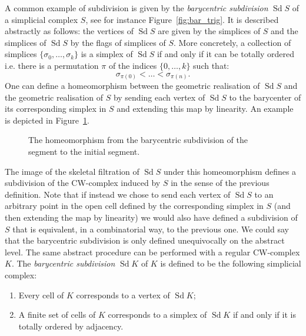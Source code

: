 \documentclass[10pt]{amsart}
\theoremstyle{definition}
\numberwithin{equation}{section}
\numberwithin{figure}{section}
\DeclareMathOperator{\Sd}{Sd}
\begin{document}
A common example of subdivision is given by the \emph{barycentric subdivision} $\Sd S$ of a simplicial complex $S$, see for instance Figure~\ref{fig:bar_trig}. It is described abstractly as follows: the vertices of $\Sd S$ are given by the simplices of $S$ and the simplices of $\Sd S$ by the flags of simplices of $S$. More concretely, a collection of simplices $\{\sigma_0,\dots,\sigma_k\}$ is a simplex of $\Sd S$ if and only if it can be totally ordered i.e. there is a permutation $\pi$ of the indices $\{0,\dots,k\}$ such that:
\begin{equation*}
\sigma_{\pi(0)} <\dots < \sigma_{\pi(n)}.
\end{equation*}
One can define a homeomorphism between the geometric realisation of $\Sd S$ and the geometric realisation of $S$ by sending each vertex of $\Sd S$ to the barycenter of its corresponding simplex in $S$ and extending this map by linearity. An example is depicted in Figure~\ref{fig:homeo_segment}.
\begin{figure}[h]
\centering
{}
\caption{The homeomorphism from the barycentric subdivision of the segment to the initial segment.}\label{fig:homeo_segment}
\end{figure}

The image of the skeletal filtration of $\Sd S$ under this homeomorphism defines a subdivision of the CW-complex induced by $S$ in the sense of the previous definition. Note that if instead we chose to send each vertex of $\Sd S$ to an arbitrary point in the open cell defined by the corresponding simplex in $S$ (and then extending the map by linearity) we would also have defined a subdivision of $S$ that is equivalent, in a combinatorial way, to the previous one. We could say that the barycentric subdivision is only defined unequivocally on the abstract level. The same abstract procedure can be performed with a regular CW-complex $K$. The \emph{barycentric subdivision} $\Sd K$ of $K$ is defined to be the following simplicial complex:
\begin{enumerate}
\item Every cell of $K$ corresponds to a vertex of $\Sd K$;
\item A finite set of cells of $K$ corresponds to a simplex of $\Sd K$ if and only if it is totally ordered by adjacency.
\end{enumerate}
\end{document}
